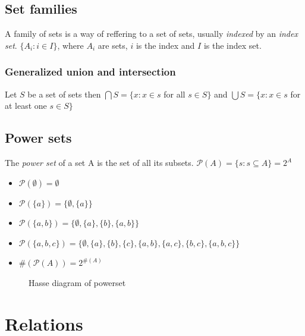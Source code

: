\documentclass[12pt]{article} %
\begin{document}
\subsection{Set families}

A family of sets is a way of reffering to a set of sets, usually \textit{indexed} by an \textit{index set}. $\{A_i : i \in I\}$, where $A_i$ are sets, $i$ is the index and $I$ is the index set.

\subsubsection{Generalized union and intersection}
Let $S$ be a set of sets then $\bigcap S = \{x : x \in s$ for all $s \in S\}$ and $\bigcup S = \{ x : x \in s$ for at least one $s \in S\}$

\subsection{Power sets}

The \textit{power set} of a set A is the set of all its subsets. $\mathcal{P}(A) = \{s : s \subseteq A \} = 2^A$

\begin{itemize}
    \item $\mathcal{P}(\emptyset) = \emptyset$
    \item $\mathcal{P}(\{a\}) = \{\emptyset, \{a\}\} $
    \item $\mathcal{P}(\{a,b\}) = \{\emptyset, \{a\}, \{b\}, \{a,b\}\}$
    \item $\mathcal{P}(\{a,b,c\}) = \{\emptyset, \{a\},\{b\},\{c\},\{a,b\},\{a,c\},\{b,c\},\{a,b,c\}\}$
    \item $\#(\mathcal{P}(A)) = 2^{\#(A)}$ 
\end{itemize}

\begin{figure}[H]
\caption{Hasse diagram of powerset}
\label{hasse diagram}
\end{figure}

\section{Relations}
\end{document}
